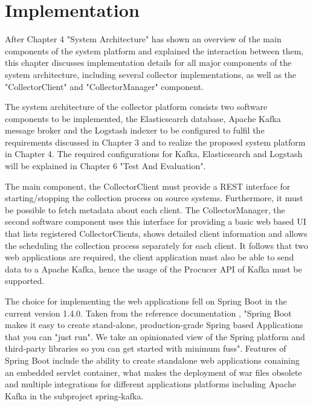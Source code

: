 \chapter{Implementation}
\label{ch:implementation}
After Chapter 4 "System Architecture" has shown an overview of the main components of
the system platform and explained the interaction between them, this chapter discusses implementation
details for all major components of the system architecture, including several
collector implementations, as well as the "CollectorClient" and "CollectorManager" component.

The system architecture of the collector platform consists two software components to
be implemented, the Elasticsearch database, Apache Kafka message broker and the Logstash
indexer to be configured to fulfil the requirements discussed in Chapter 3 and to realize the
proposed system platform in Chapter 4. The required configurations for Kafka, Elasticsearch and Logstash
will be explained in Chapter 6 "Test And Evaluation".

The main component, the CollectorClient must provide a REST interface for starting/stopping the collection process
on source systems. Furthermore, it must be possible to fetch metadata about each client. The CollectorManager,
the second software component uses this interface for providing a basic web based UI that lists registered
CollectorClients, shows detailed client information and allows the scheduling the collection process separately
for each client. It follows that two web applications are required, the client application must also be able to
send data to a Apache Kafka, hence the usage of the Procucer API of Kafka must be supported.

The choice for implementing the web applications fell on Spring Boot in the current version 1.4.0. Taken from
the reference documentation \cite{SpringB16}, "Spring Boot makes it easy to create stand-alone, production-grade
Spring based Applications that you can "just run". We take an opinionated view of the Spring platform and
third-party libraries so you can get started with minimum fuss". Features of Spring Boot include the ability to create
standalone web applications conaining an embedded servlet container, what makes the deployment of war files obsolete
and multiple integrations for different applications platforms including Apache Kafka in the subproject spring-kafka.

